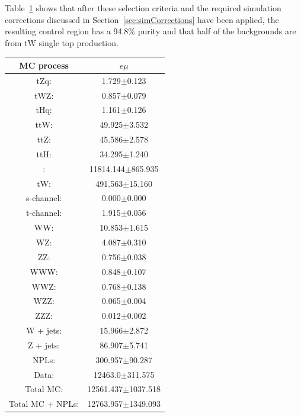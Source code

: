 Table~\ref{tab:ttbarCR} shows that after these selection criteria and the required simulation corrections discussed in Section~\ref{sec:simCorrections} have been applied, the resulting control region has a 94.8\% purity and that half of the backgrounds are from tW single top production.
\begin{table}[htbp]
\label{tab:ttbarCR}
  \centering
 \begin{tabular}{cc}
   \hline
   \textbf{MC process} & \textbf{$e\mu$}  \\
   \hline
	tZq\@: & 1.729$\pm$0.123  \\
	tWZ\@: & 0.857$\pm$0.079  \\
	tHq\@: & 1.161$\pm$0.126  \\
	ttW\@: & 49.925$\pm$3.532   \\
	ttZ\@: & 45.586$\pm$2.578   \\
	ttH\@: & 34.295$\pm$1.240  \\
	\ttbar: & 11814.144$\pm$865.935   \\
	tW\@: & 491.563$\pm$15.160   \\
	s-channel\@: &  0.000$\pm$0.000 \\
	t-channel\@: & 1.915$\pm$0.056 \\
	WW\@: & 10.853$\pm$1.615  \\
	WZ\@: & 4.087$\pm$0.310 \\
	ZZ\@: & 0.756$\pm$0.038 \\
	WWW\@: & 0.848$\pm$0.107     \\
	WWZ\@: & 0.768$\pm$0.138     \\
	WZZ\@: & 0.065$\pm$0.004     \\
	ZZZ\@: & 0.012$\pm$0.002     \\
	W + jets\@: & 15.966$\pm$2.872     \\
	Z + jets\@: & 86.907$\pm$5.741     \\
	NPLs\@: & 300.957$\pm$90.287     \\
	\hline
	Data\@: & 12463.0$\pm$311.575     \\
	\hline
	Total MC\@: & 12561.437$\pm$1037.518     \\
	Total MC + NPLs\@: & 12763.957$\pm$1349.093     \\
   \hline
 \end{tabular}
\end{table}


